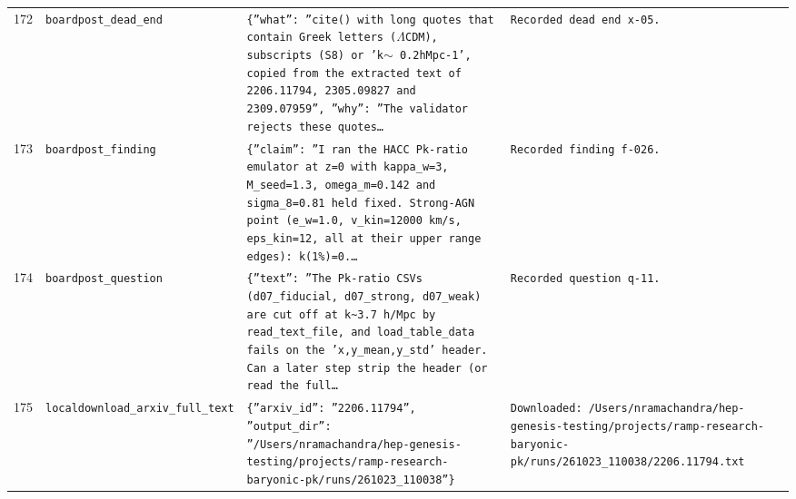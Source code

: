 \documentclass[11pt,a4paper]{article}
\begin{document}
\begin{longtable}{@{}p{}p{}p{}p{}@{}}
172 & \texttt{board}\newline\texttt{post\_\allowbreak{}dead\_\allowbreak{}end} & \texttt{\{''what'':\allowbreak{} ''cite()\allowbreak{} with long quotes that contain Greek letters ($\Lambda$CDM)\allowbreak{},\allowbreak{} subscripts (S8)\allowbreak{} or 'k$\sim$ 0.2hMpc-1',\allowbreak{} copied from the extracted text of 2206.11794,\allowbreak{} 2305.09827 and 2309.07959'',\allowbreak{} ''why'':\allowbreak{} ''The validator rejects these quotes\ldots{}\allowbreak{}} & \texttt{Recorded dead end x-05.} \\
173 & \texttt{board}\newline\texttt{post\_\allowbreak{}finding} & \texttt{\{''claim'':\allowbreak{} ''I ran the HACC Pk-ratio emulator at z=\allowbreak{}0 with kappa\_\allowbreak{}w=\allowbreak{}3,\allowbreak{} M\_\allowbreak{}seed=\allowbreak{}1.3,\allowbreak{} omega\_\allowbreak{}m=\allowbreak{}0.142 and sigma\_\allowbreak{}8=\allowbreak{}0.81 held fixed. Strong-AGN point (e\_\allowbreak{}w=\allowbreak{}1.0,\allowbreak{} v\_\allowbreak{}kin=\allowbreak{}12000 km/\allowbreak{}s,\allowbreak{} eps\_\allowbreak{}kin=\allowbreak{}12,\allowbreak{} all at their upper range edges)\allowbreak{}:\allowbreak{} k(1\%)\allowbreak{}=\allowbreak{}0.\ldots{}\allowbreak{}} & \texttt{Recorded finding f-026.} \\
174 & \texttt{board}\newline\texttt{post\_\allowbreak{}question} & \texttt{\{''text'':\allowbreak{} ''The Pk-ratio CSVs (d07\_\allowbreak{}fiducial,\allowbreak{} d07\_\allowbreak{}strong,\allowbreak{} d07\_\allowbreak{}weak)\allowbreak{} are cut off at k\textasciitilde{}\allowbreak{}3.7 h/\allowbreak{}Mpc by read\_\allowbreak{}text\_\allowbreak{}file,\allowbreak{} and load\_\allowbreak{}table\_\allowbreak{}data fails on the 'x,\allowbreak{}y\_\allowbreak{}mean,\allowbreak{}y\_\allowbreak{}std' header. Can a later step strip the header (or read the full\ldots{}\allowbreak{}} & \texttt{Recorded question q-11.} \\
175 & \texttt{local}\newline\texttt{download\_\allowbreak{}arxiv\_\allowbreak{}full\_\allowbreak{}text} & \texttt{\{''arxiv\_\allowbreak{}id'':\allowbreak{} ''2206.11794'',\allowbreak{} ''output\_\allowbreak{}dir'':\allowbreak{} ''/\allowbreak{}Users/\allowbreak{}nramachandra/\allowbreak{}hep-genesis-testing/\allowbreak{}projects/\allowbreak{}ramp-research-baryonic-pk/\allowbreak{}runs/\allowbreak{}261023\_\allowbreak{}110038''\}\allowbreak{}} & \texttt{Downloaded:\allowbreak{} /\allowbreak{}Users/\allowbreak{}nramachandra/\allowbreak{}hep-genesis-testing/\allowbreak{}projects/\allowbreak{}ramp-research-baryonic-pk/\allowbreak{}runs/\allowbreak{}261023\_\allowbreak{}110038/\allowbreak{}2206.11794.txt} \\

\end{longtable}
\end{document}
